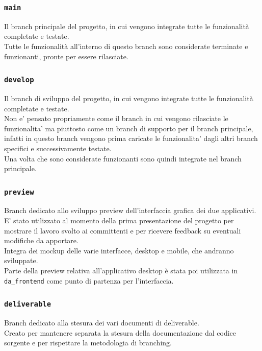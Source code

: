 \documentclass{article}
\begin{document}
\subsubsection{\texttt{main}}

Il branch principale del progetto, in cui vengono integrate tutte le funzionalità completate e testate.\\
Tutte le funzionalità all'interno di questo branch sono considerate terminate e funzionanti, pronte per essere rilasciate.

\subsubsection{\texttt{develop}}

Il branch di sviluppo del progetto, in cui vengono integrate tutte le funzionalità completate e testate.\\
Non e' pensato propriamente come il branch in cui vengono rilasciate le funzionalita' ma piuttosto come un branch di supporto per il branch principale, infatti in questo branch vengono prima caricate le funzionalita' dagli altri branch specifici e successivamente testate.\\
Una volta che sono considerate funzionanti sono quindi integrate nel branch principale.

\subsubsection{\texttt{preview}}

Branch dedicato allo sviluppo preview dell'interfaccia grafica dei due applicativi.\\
E' stato utilizzato al momento della prima presentazione del progetto per mostrare il lavoro svolto ai committenti e per ricevere feedback su eventuali modifiche da apportare.\\
Integra dei mockup delle varie interfacce, desktop e mobile, che andranno sviluppate.\\
Parte della preview relativa all'applicativo desktop è stata poi utilizzata in \texttt{da\_frontend} come punto di partenza per l'interfaccia.

\subsubsection{\texttt{deliverable}}

Branch dedicato alla stesura dei vari documenti di deliverable.\\
Creato per mantenere separata la stesura della documentazione dal codice sorgente e per rispettare la metodologia di branching.
\end{document}
